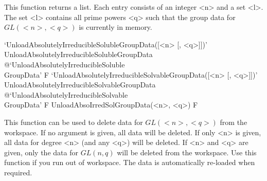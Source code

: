 This function returns a list. Each entry consists of an integer <n> and a set <l>. The set
<l> contains all prime powers <q> such that the group data for $GL(<n>, <q>)$ is currently in memory.

\>`UnloadAbsolutelyIrreducibleSolubleGroupData([<n> [, <q>]])'%
{UnloadAbsolutelyIrreducibleSolubleGroupData}%
@{`UnloadAbsolutelyIrreducibleSoluble\\GroupData'} F
\>`UnloadAbsolutelyIrreducibleSolvableGroupData([<n> [, <q>]])'%
{UnloadAbsolutelyIrreducibleSolvableGroupData}%
@{`UnloadAbsolutelyIrreducibleSolvable\\GroupData'} F
\>UnloadAbsoIrredSolGroupData(<n>, <q>) F

This function can be used to delete data for $GL(<n>, <q>)$ from the {\GAP} workspace. If no argument
is given, all data will be deleted. If only <n> is given, all data for degree <n> (and any <q>) will
be deleted. If <n> and <q> are given, only the data for $GL(n, q)$ will be deleted from the {\GAP}
workspace. Use this function if you run out of {\GAP} workspace. The
data is automatically re-loaded when required.


